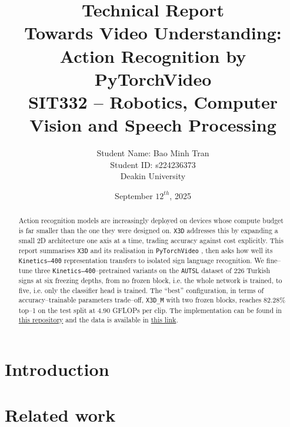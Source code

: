 \documentclass[11pt,a4paper]{article}
\title{\textbf{Technical Report  \\ Towards Video Understanding: Action Recognition by PyTorchVideo}\\[6pt]
       \large {SIT332 – Robotics, Computer Vision and Speech Processing}}
\author{Student Name: Bao Minh Tran \\
 Student ID: s224236373 \\
  Deakin University}
\date{September $12^{th}$, 2025}
\theoremstyle{definition}
\theoremstyle{remark}
\begin{document}


\begin{abstract}
    \noindent
    Action recognition models are increasingly deployed on devices whose compute budget is far smaller than the one they were designed on. 
    \texttt{X3D} \cite{feichtenhofer2020x3d} addresses this by expanding a small 2D architecture one axis at a time, trading accuracy against cost explicitly. 
    This report summarises \texttt{X3D} and its realisation in \texttt{PyTorchVideo} \cite{fan2021pytorchvideo}, then asks how well its \texttt{Kinetics--400} representation transfers to isolated sign language recognition. 
    We fine–tune three \texttt{Kinetics–400}–pretrained variants on the \texttt{AUTSL} dataset \cite{sincan2020autsl} of $226$ Turkish signs at six freezing depths, from no frozen block, i.e. the whole network is trained, to five, i.e. only the classifier head is trained.
    The ``best'' configuration, in terms of accuracy–trainable parameters trade–off, \texttt{X3D\_M} with two frozen blocks, reaches $82.28\%$ top--1 on the test split at $4.90$ GFLOPs per clip.
    The implementation can be found in \href{https://github.com/Trminh06-work/X3D_4_SignLang.git}{this repository} and the data is available in \href{https://www.kaggle.com/datasets/baominhtran06/sit332-autsl4x3d}{this link}.
\end{abstract}

\setcounter{tocdepth}{3}
\tableofcontents
\newpage

\section{Introduction}





\newpage
\section{Related work}




\newpage
\end{document}
